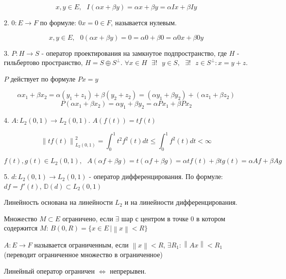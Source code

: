 \documentclass[12pt, a4paper]{report}
\begin{document}
\[ x, y \in  E ,\text{ }   I (\alpha x + \beta y ) = \alpha x + \beta y = \alpha I x + \beta I y \] 

2. \( 0 : E \to  F  \) по формуле: \( 0 x = 0 \in  F  \), называется нулевым. 

\[ x,y \in  E, \text{ }  0 (\alpha x  + \beta y ) = 0 = \alpha 0 + \beta 0 = \alpha 0 x + \beta 0 y \] 

3. \( P : H \to  S  \) - оператор проектирования на замкнутое подпространство, где \( H  \) - гильбертово пространство, \( H = S \oplus  S ^{ \perp  }  \). \( \forall  x \in  H \text{ }  \exists  ! \text{ }  y \in  S , \text{ } \exists  !\text{ }   z \in  S ^{ \perp } : x = y +z   \). 

\( P \) действует по формуле \( Px = y  \) 

\[ \alpha x_1 + \beta x_2 = \alpha ( y_1 + z_1 ) + \beta ( y_2 + z_2 ) = (\alpha y_1 + \beta y_2 ) + (\alpha z_1 + \beta z_2 ) \] 
\[ P(\alpha x_1 + \beta x_2 ) = \alpha y_1 + \beta y_2 =  \alpha P x_1 + \beta P x_2 \] 

4. \( A : L_2 (0,1 ) \to  L_2 (0,1 ) \). \( A(f (t )) = t f(t ) \)    

\[ \left\lVert t f(t ) \right\rVert _{L_2(0,1)}   ^2 = \int_{0}^{1 }  t ^2 f ^2 (t ) dt \le \int_{0 }^{1 }  f ^2 (t ) dt < \infty \] 

\[ f (t), g (t)\in  L_2 (0,1 ), \text{ }  A(\alpha f + \beta g ) = t ( \alpha f + \beta g )  = \alpha t f (t )+ \beta t g (t ) = \alpha A f + \beta A g \] 

5. \( d: L_2 (0,1  ) \to  L_2 (0,1  )  \) - оператор дифференцирования. По формуле: \( d f = f'(t) \), \( \mathbb{D} (d ) \subset L_2 (0,1) \) 

Линейность основана на линейности \( L_2  \) и на линейности дифференцирования. 

\begin{definition}
    Множество \( M \subset E  \)  ограничено, если \( \exists   \)  шар с центром в точке 0 в котором содержится \( M \): \( B(0 , R ) = \{ x \in  E \,| \left\lVert  x  \right\rVert < R  \} \)  
\end{definition}

\begin{definition}
    \( A: E \to  F  \) называется ограниченным, если \( \left\lVert  x \right\rVert < R  \),  \( \exists R_1 :  \left\lVert  A x \right\rVert < R_1  \)  (переводит ограниченное множество в ограниченное)
\end{definition}

\begin{theorem}
    Линейный оператор ограничен \( \Leftrightarrow  \)  непрерывен.
\end{theorem}
\end{document}
